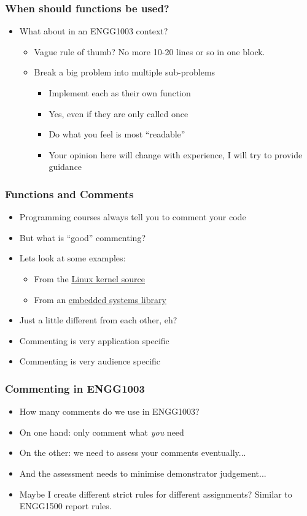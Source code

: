 \documentclass[14pt]{beamer}
\begin{document}
\begin{frame}
\frametitle{When should functions be used?}
\begin{itemize}
\item What about in an ENGG1003 context?
\pause
	\begin{itemize}
		\item Vague rule of thumb? No more 10-20 lines or so in one block.
		\item Break a big problem into multiple sub-problems
			\begin{itemize}
				\item Implement each as their own function
				\pause
				\item Yes, even if they are only called once
				\pause
				\item Do what you feel is most ``readable''
				\pause
				\item Your opinion here will change with experience, I will try to provide guidance
			\end{itemize}
	\end{itemize}
\end{itemize}
\end{frame}

\begin{frame}
\frametitle{Functions and Comments}
\begin{itemize}
\item Programming courses always tell you to comment your code
\item But what is ``good'' commenting?
\item Lets look at some examples:
\pause
	\begin{itemize}
		\item From the \underline{\href{https://raw.githubusercontent.com/torvalds/linux/master/kernel/async.c}{Linux kernel source}}
		\pause
		\item From an \underline{\href{http://libopencm3.org/docs/latest/stm32f4/html/adc_8c_source.html}{embedded systems library}}
	\end{itemize}
\pause
\item Just a little different from each other, eh?
\item Commenting is very application specific
\item Commenting is very audience specific
\end{itemize}
\end{frame}

\begin{frame}
\frametitle{Commenting in ENGG1003}
\begin{itemize}
\item How many comments do we use in ENGG1003?
\item On one hand: only comment what \textit{you} need
\item On the other: we need to assess your comments eventually...
\pause
\item And the assessment needs to minimise demonstrator judgement...
\pause
\item Maybe I create different strict rules for different assignments? Similar to ENGG1500 report rules.
\end{itemize}
\end{frame}
\end{document}
